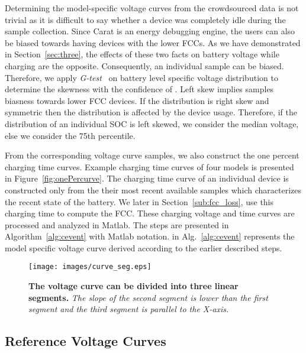\documentclass[journal]{IEEEtran}
\begin{document}
Determining the model-specific voltage curves from the crowdsourced data is not trivial as it is difficult to say whether a device was completely idle during the sample collection. Since Carat is an energy debugging engine, the users can also be biased towards having devices with the lower FCCs. As we have demonstrated in Section~\ref{sec:three}, the effects of these two facts on battery voltage while charging are the opposite. Consequently, an individual sample can be biased. Therefore, we apply \textit{G-test}~\cite{kartusis} on battery level specific voltage distribution to determine the skewness with the confidence of . Left skew implies samples biasness towards lower FCC devices. If the distribution is right skew and symmetric then the distribution is affected by the device usage. Therefore, if the distribution of an individual SOC is left skewed, we consider the median voltage, else we consider the 75th percentile. 


From the corresponding voltage curve samples, we also construct the one percent charging time curves. Example charging time curves of four models is presented in Figure~\ref{fig:onePercurve}. The charging time curve of an individual device is constructed only from the their most recent available samples which characterizes the recent state of the battery. We later in Section~\ref{sub:fcc_loss}, use this charging time to compute the FCC. These charging voltage and time curves are processed and analyzed in Matlab. The steps are presented in Algorithm~\ref{alg:cevent} with Matlab notation.  in Alg.~\ref{alg:cevent} represents the model specific voltage curve derived according to the earlier described steps.





\begin{figure}[t]
  \begin{center}
 \texttt{[image: images/curve\_seg.eps]}
\caption{{\bf The voltage curve can be divided into three linear segments.} {\sl The slope of the second segment is lower than the first segment and the third segment is parallel to the X-axis.}}
\label{fig:curve_seg}
 \end{center}
 \end{figure}






\subsection{Reference Voltage Curves}
\end{document}

